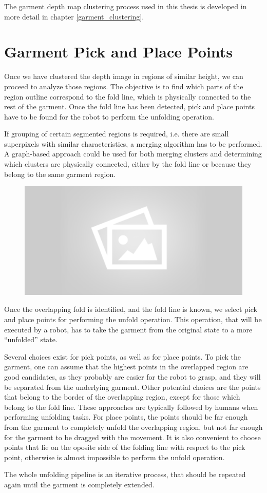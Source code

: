 The garment depth map clustering process used in this thesis is developed in more detail in chapter \ref{garment_clustering}.

\section{Garment Pick and Place Points}
\label{garment_PnP_points}

Once we have clustered the depth image in regions of similar height, we can proceed to analyze those regions. The objective is to find which parts of the region outline correspond to the fold line, which is physically connected to the rest of the garment. Once the fold line has been detected, pick and place points have to be found for the robot to perform the unfolding operation.

If grouping of certain segmented regions is required, i.e. there are small superpixels with similar characteristics, a merging algorithm has to be performed. A graph-based approach could be used for both merging clusters and determining which clusters are physically connected, either by the fold line or because they belong to the same garment region.

\begin{figure}[thpb]
    \centering
    \includegraphics[width=0.8
    \textwidth]{figures/placeholder2.png}
    \caption{}
    \label{fig:generic_superpixels}
\end{figure}


Once the overlapping fold is identified, and the fold line is known, we select pick and place points for performing the unfold operation. This operation, that will be executed by a robot, has to take the garment from the original state to a more ``unfolded'' state.

Several choices exist for pick points, as well as for place points. To pick the garment, one can assume that the highest points in the overlapped region are good candidates, as they probably are easier for the robot to grasp, and they will be separated from the underlying garment. Other potential choices are the points that belong to the border of the overlapping region, except for those which belong to the fold line. These approaches are typically followed by humans when performing unfolding tasks. For place points, the points should be far enough from the garment to completely unfold the overlapping region, but not far enough for the garment to be dragged with the movement. It is also convenient to choose points that lie on the oposite side of the folding line with respect to the pick point, otherwise is almost impossible to perform the unfold operation.

The whole unfolding pipeline is an iterative process, that should be repeated again until the garment is completely extended.

